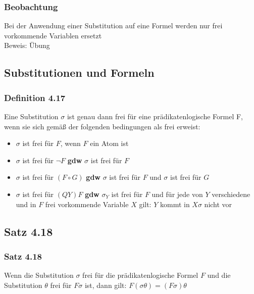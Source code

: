 \subsubsection{Beobachtung}
Bei der Anwendung einer Substitution auf eine Formel werden nur frei vorkommende Variablen ersetzt\\
Beweis: Übung
\subsection{Substitutionen und Formeln}
\subsubsection{Definition 4.17}
Eine Substitution \(\sigma\) ist genau dann frei für eine prädikatenlogische Formel F, wenn sie sich gemäß der folgenden bedingungen als frei erweist:
\begin{itemize}
	\item \(\sigma\) ist frei für \(F\), wenn \(F\) ein Atom ist
	\item \(\sigma\) ist frei für \(\neg F\) \textbf{gdw} \(\sigma\) ist frei für \(F\)
	\item \(\sigma\) ist frei für \((F\circ G)\) \textbf{gdw} \(\sigma\) ist frei für \(F\) und \(\sigma\) ist frei für \(G\)
	\item \(\sigma\) ist frei für \((QY)F\) \textbf{gdw} \(\sigma_{Y}\) ist frei für \(F\) und für jede von \(Y\) verschiedene und in \(F\) frei vorkommende Variable \(X\) gilt: \(Y\) kommt in \(X\sigma\) nicht vor 
\end{itemize}
\subsection{Satz 4.18}
\subsubsection{Satz 4.18}
Wenn die Substitution \(\sigma\) frei für die prädikatenlogische Formel \(F\) und die Substitution \(\theta\) frei für \(F\sigma\) ist, dann gilt: \(F(\sigma\theta) = (F\sigma)\theta \)
